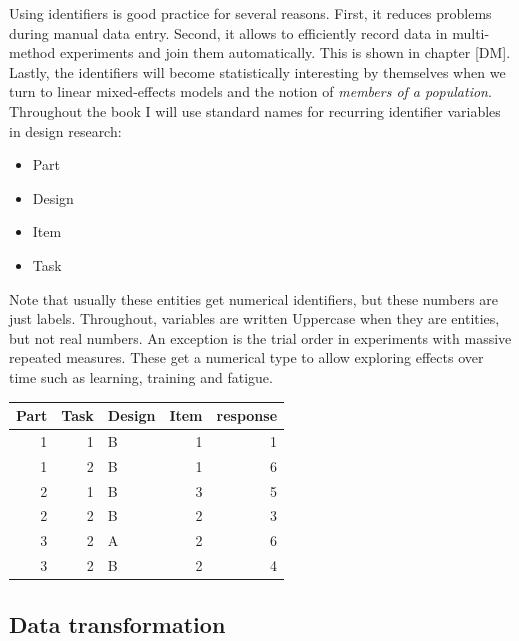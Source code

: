\documentclass[]{svmono}
\newenvironment{Shaded}{\begin{snugshade}}{\end{snugshade}}
\newcommand{\KeywordTok}[1]{\textcolor[rgb]{0.13,0.29,0.53}{\textbf{#1}}}
\newcommand{\DecValTok}[1]{\textcolor[rgb]{0.00,0.00,0.81}{#1}}
\newcommand{\StringTok}[1]{\textcolor[rgb]{0.31,0.60,0.02}{#1}}
\newcommand{\OperatorTok}[1]{\textcolor[rgb]{0.81,0.36,0.00}{\textbf{#1}}}
\newcommand{\NormalTok}[1]{#1}
\providecommand{\tightlist}{%
  \setlength{\itemsep}{0pt}\setlength{\parskip}{0pt}}
\begin{document}
Using identifiers is good practice for several reasons. First, it
reduces problems during manual data entry. Second, it allows to
efficiently record data in multi-method experiments and join them
automatically. This is shown in chapter {[}DM{]}. Lastly, the
identifiers will become statistically interesting by themselves when we
turn to linear mixed-effects models and the notion of \emph{members of a
population}. Throughout the book I will use standard names for recurring
identifier variables in design research:

\begin{itemize}
\tightlist
\item
  Part
\item
  Design
\item
  Item
\item
  Task
\end{itemize}

Note that usually these entities get numerical identifiers, but these
numbers are just labels. Throughout, variables are written Uppercase
when they are entities, but not real numbers. An exception is the trial
order in experiments with massive repeated measures. These get a
numerical type to allow exploring effects over time such as learning,
training and fatigue.

\begin{Shaded}
\end{Shaded}

\begin{tabular}{r|r|l|r|r}
\hline
Part & Task & Design & Item & response\\
\hline
1 & 1 & B & 1 & 1\\
\hline
1 & 2 & B & 1 & 6\\
\hline
2 & 1 & B & 3 & 5\\
\hline
2 & 2 & B & 2 & 3\\
\hline
3 & 2 & A & 2 & 6\\
\hline
3 & 2 & B & 2 & 4\\
\hline
\end{tabular}

\subsection{Data transformation}\label{data-transformation}
\end{document}
